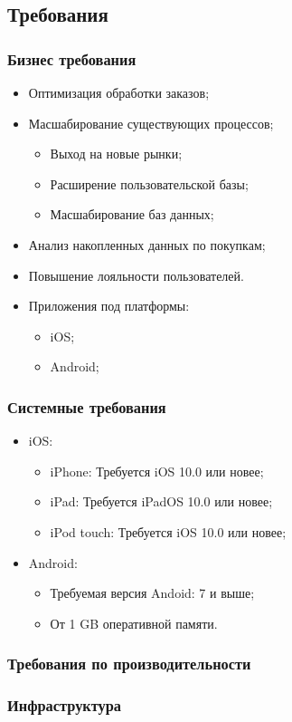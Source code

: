 \documentclass[a4paper,8pt]{article}
\begin{document}
\subsection{Требования}

\subsubsection{Бизнес требования}


    \begin{itemize}
        \item Оптимизация обработки заказов;
        \item Масшабирование существующих процессов;
            \begin{itemize}
                \item Выход на новые рынки;
                \item Расширение пользовательской базы;
                \item Масшабирование баз данных;
            \end{itemize}
        \item Анализ накопленных данных по покупкам;
        \item Повышение лояльности пользователей.
        \item Приложения под платформы:
            \begin{itemize}
                \item iOS;
                \item Android;
            \end{itemize}

    \end{itemize}


\subsubsection{Системные требования}
    \begin{itemize}
        \item iOS:
            \begin{itemize}
                \item iPhone: Требуется iOS 10.0 или новее;
                \item iPad: Требуется iPadOS 10.0 или новее;
                \item iPod touch: Требуется iOS 10.0 или новее;
            \end{itemize}
        \item Android:
            \begin{itemize}
                \item Требуемая версия Andoid: 7 и выше;
                \item От 1 GB оперативной памяти.
            \end{itemize}
    \end{itemize}


\subsubsection{Требования по производительности}




\subsubsection{Инфраструктура}
\end{document}
